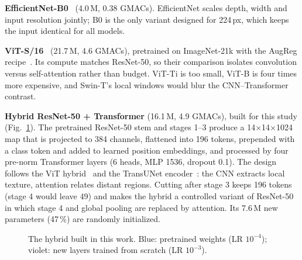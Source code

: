 \documentclass[conference]{IEEEtran}
\begin{document}
\textbf{EfficientNet-B0}~\cite{tan2019efficientnet} (4.0\,M, 0.38 GMACs). EfficientNet scales depth, width and input
resolution jointly; B0 is the only variant designed for 224\,px, which keeps the input identical for all models.

\textbf{ViT-S/16}~\cite{dosovitskiy2021vit} (21.7\,M, 4.6 GMACs), pretrained on ImageNet-21k with the AugReg
recipe~\cite{steiner2022augreg}. Its compute matches ResNet-50, so their comparison isolates convolution versus
self-attention rather than budget. ViT-Ti is too small, ViT-B is four times more expensive, and Swin-T's local windows
would blur the CNN--Transformer contrast.

\textbf{Hybrid ResNet-50 + Transformer} (16.1\,M, 4.9 GMACs), built for this study (Fig.~\ref{fig:hybrid}). The
pretrained ResNet-50 stem and stages 1--3 produce a 14$\times$14$\times$1024 map that is projected to 384 channels,
flattened into 196 tokens, prepended with a class token and added to learned position embeddings, and processed by four
pre-norm Transformer layers (6 heads, MLP 1536, dropout 0.1). The design follows the ViT hybrid~\cite{dosovitskiy2021vit}
and the TransUNet encoder~\cite{chen2021transunet}: the CNN extracts local texture, attention relates distant regions.
Cutting after stage 3 keeps 196 tokens (stage 4 would leave 49) and makes the hybrid a controlled variant of ResNet-50
in which stage 4 and global pooling are replaced by attention. Its 7.6\,M new parameters (47\,\%) are randomly
initialized.

\begin{figure}[t]
\centering
{}
\caption{The hybrid built in this work. Blue: pretrained weights (LR $10^{-4}$); violet: new layers trained from scratch (LR $10^{-3}$).}
\label{fig:hybrid}
\end{figure}
\end{document}
